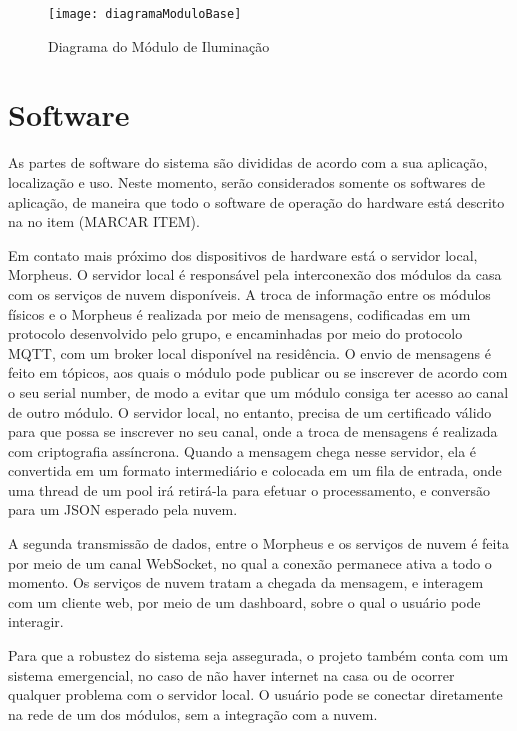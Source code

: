 \begin{figure}[htb]
	\caption{\label{fig:diagramaModuloBase}Diagrama do Módulo de Iluminação}
	\begin{center}
		\texttt{[image: diagramaModuloBase]}
	\end{center}
\end{figure}


\section{Software}

As partes de software do sistema são divididas de acordo com a sua aplicação, localização e uso. Neste momento, serão considerados somente os softwares de aplicação, de maneira que todo o software de operação do hardware está descrito na no item (MARCAR ITEM).

Em contato mais próximo dos dispositivos de hardware está o servidor local, Morpheus. O servidor local é responsável pela interconexão dos módulos da casa com os serviços de nuvem disponíveis. A troca de informação entre os módulos físicos e o Morpheus é realizada por meio de mensagens, codificadas em um protocolo desenvolvido pelo grupo, e encaminhadas por meio do protocolo MQTT, com um broker local disponível na residência. O envio de mensagens é feito em tópicos, aos quais o módulo pode publicar ou se inscrever de acordo com o seu serial number, de modo a evitar que um módulo consiga ter acesso ao canal de outro módulo. O servidor local, no entanto, precisa de um certificado válido para que possa se inscrever no seu canal, onde a troca de mensagens é realizada com criptografia assíncrona. Quando a mensagem chega nesse servidor, ela é convertida em um formato intermediário e colocada em um fila de entrada, onde uma thread de um pool irá retirá-la para efetuar o processamento, e conversão para um JSON esperado pela nuvem.

A segunda transmissão de dados, entre o Morpheus e os serviços de nuvem é feita por meio de um canal WebSocket, no qual a conexão permanece ativa a todo o momento. Os serviços de nuvem tratam a chegada da mensagem, e interagem com um cliente web, por meio de um dashboard, sobre o qual o usuário pode interagir.


Para que a robustez do sistema seja assegurada, o projeto também conta com um sistema emergencial, no caso de não haver internet na casa ou de ocorrer qualquer problema com o servidor local. O usuário pode se conectar diretamente na rede de um dos módulos, sem a integração com a nuvem.

